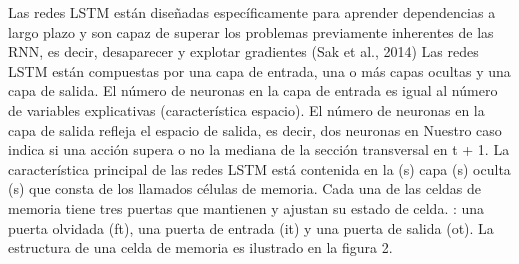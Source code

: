  Las redes LSTM están diseñadas específicamente para aprender dependencias a largo plazo y son
capaz de superar los problemas previamente inherentes de las RNN, es decir, desaparecer y explotar
gradientes (Sak et al., 2014)
Las redes LSTM están compuestas por una capa de entrada, una o más capas ocultas y una capa de salida.
El número de neuronas en la capa de entrada es igual al número de variables explicativas (característica
espacio). El número de neuronas en la capa de salida refleja el espacio de salida, es decir, dos neuronas en
Nuestro caso indica si una acción supera o no la mediana de la sección transversal en t + 1.
La característica principal de las redes LSTM está contenida en la (s) capa (s) oculta (s) que consta de los llamados
células de memoria. Cada una de las celdas de memoria tiene tres puertas que mantienen y ajustan su estado de celda.
:
una puerta olvidada (ft), una puerta de entrada (it) y una puerta de salida (ot). La estructura de una celda de memoria es
ilustrado en la figura 2.
 
 
